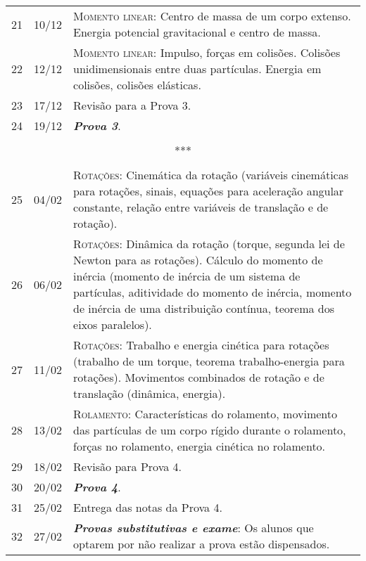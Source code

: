 \begin{center}
\begin{longtable}{ccp{70mm}}
21	 & 	10/12	 & 	\textsc{Momento linear:} Centro de massa de um corpo extenso. Energia potencial gravitacional e centro de massa. \\
22	 & 	12/12	 & 	\textsc{Momento linear:} Impulso, forças em colisões. Colisões unidimensionais entre duas partículas. Energia em colisões, colisões elásticas. \\
23	 & 	17/12	 & 	Revisão para a Prova 3. \\
24	 & 	19/12	 & 	\textbf{\textit{Prova 3}}. \\
\\
\multicolumn{3}{c}{***} \\
\\
25	 & 	04/02	 & 	\textsc{Rotações:} Cinemática da rotação (variáveis cinemáticas para rotações, sinais, equações para aceleração angular constante, relação entre variáveis de translação e de rotação). \\
26	 & 	06/02	 & 	\textsc{Rotações:} Dinâmica da rotação (torque, segunda lei de Newton para as rotações). Cálculo do momento de inércia (momento de inércia de um sistema de partículas, aditividade do momento de inércia, momento de inércia de uma distribuição contínua, teorema dos eixos paralelos). \\
27	 & 	11/02	 & 	\textsc{Rotações:} Trabalho e energia cinética para rotações (trabalho de um torque, teorema trabalho-energia para rotações). Movimentos combinados de rotação e de translação (dinâmica, energia). \\
28	 &  13/02	 & 	\textsc{Rolamento:} Características do rolamento, movimento das partículas de um corpo rígido durante o rolamento, forças no rolamento, energia cinética no rolamento. \\
29	 & 	18/02	 & 	Revisão para Prova 4. \\
30	 & 	20/02	 & 	\textbf{\textit{Prova 4}}. \\
31	 & 	25/02	 & 	Entrega das notas da Prova 4. \\
32	 & 	27/02	 & 	\textbf{\textit{Provas substitutivas e exame}}: Os alunos que optarem por não realizar a prova estão dispensados.
\end{longtable}
\end{center}


\cleardoublepage

